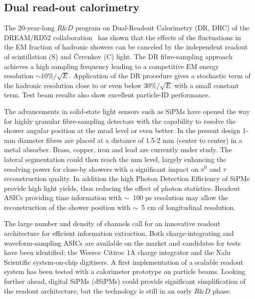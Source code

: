  
\subsection{Dual read-out calorimetry}
\label{sec:det-dual-readout-calorimetry}



The 20-year-long $R\&D$ program on Dual-Readout Calorimetry (DR, DRC) of the DREAM/RD52 collaboration~\cite{DRC_Wigmans,RD52_emshow,RD52_emperf,RD52_hadperf,RD52_MC,RD52_PID,RD52_SiPM,IDEA_SiPM} has shown that  the effects of the fluctuations in the EM fraction of hadronic showers can be canceled by the independent readout of scintillation (S) and \v{C}erenkov (C) light. The DR fibre-sampling approach achieves a high sampling frequency leading to a competitive EM energy resolution $\sim 10\%/\sqrt{E}$. Application of the DR  procedure gives a stochastic term of the hadronic resolution close to or even below $30\%/\sqrt{E}$ with a small constant term. Test beam results also show excellent particle-ID performance.


The advancements in solid-state light sensors such as SiPMs have opened the way for highly granular fibre-sampling detectors with the capability to resolve the shower angular position at the mrad level or even better.
In the present design 1-mm diameter fibres are placed at a distance  of 1.5-2 mm (center to center) in a metal absorber. Brass, copper, iron and lead are currently under study. The lateral segmentation could then reach the mm level, largely enhancing the resolving power for close-by showers with a significant impact on $\pi^0$ and $\tau$ reconstruction quality. In addition the high Photon Detection Efficiency of SiPMs provide high light yields, thus reducing the effect of photon statistics.
Readout ASICs providing time information with $\sim$~100 ps resolution may allow the reconstruction of the shower position with $\sim$~5 cm of longitudinal resolution.

The large number and density of channels call for an innovative readout architecture for efficient information extraction. Both charge-integrating and waveform-sampling ASICs are available on the market and candidates for tests have been identified: the Weeroc Citiroc 1A charge integrator and the Nalu Scientific system-on-chip digitisers.  A first implementation of a scalable readout system has been tested with a calorimeter prototype on particle beams. Looking further ahead, digital SiPMs (dSiPMs) could provide significant simplification of the readout architecture, but the technology is still in an early $R\&D$ phase.

